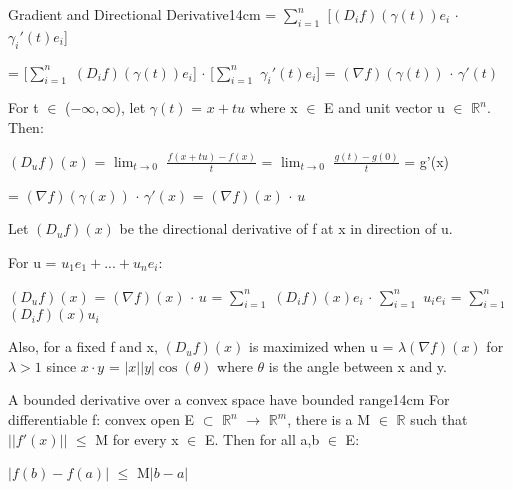 \begin{definition}{Gradient and Directional Derivative}{14cm}
        \hspace{2.15cm}
        = $\sum_{i=1}^n$ [$(D_if)(\gamma(t))e_i$ $\cdot$ $\gamma_i'(t)e_i$]

        \hspace{2.15cm}
        = [$\sum_{i=1}^n$ $(D_if)(\gamma(t))e_i$]
        $\cdot$ [$\sum_{i=1}^n$ $\gamma_i'(t)e_i$]
        = $(\nabla f)(\gamma(t))$ $\cdot$ $\gamma'(t)$

        For t $\in$ ($-\infty,\infty$), let $\gamma(t)$ = $x + tu$
        where x $\in$ E and unit vector u $\in$ $\mathbb{R}^n$. Then:

        \hspace{0.5cm}
        $(D_uf)(x)$
        = $\lim_{t \rightarrow 0}$ $\frac{f(x+tu) - f(x)}{t}$
        = $\lim_{t \rightarrow 0}$ $\frac{g(t) - g(0)}{t}$
        = g'(x)

        \hspace{2.3cm}
        = $(\nabla f)(\gamma(x))$ $\cdot$ $\gamma'(x)$
        = $(\nabla f)(x)$ $\cdot$ $u$

        Let $(D_uf)(x)$ be the {\color{lblue} directional derivative}
        of f at x in direction of u.

        For u = $u_1e_1 + ... + u_ne_i$:

        \hspace{0.5cm}
        $(D_uf)(x)$
        = $(\nabla f)(x)$ $\cdot$ $u$
        = $\sum_{i=1}^n$ $(D_if)(x)e_i$ $\cdot$ $\sum_{i=1}^n$ $u_ie_i$
        = $\sum_{i=1}^n$ $(D_if)(x)u_i$

        \vspace{0.3cm}

        Also, for a fixed f and x, $(D_uf)(x)$ is maximized when
        u = $\lambda (\nabla f)(x)$ for $\lambda > 1$
        since $x \cdot y$ = $|x| |y| \cos(\theta)$ where $\theta$ is the angle
        between x and y.
    \end{definition}

    \vspace{0.5cm}



    \begin{wtheorem}
    {A bounded derivative over a convex space have bounded range}{14cm}
        For differentiable f: convex open E $\subset$ $\mathbb{R}^n$
        $\rightarrow$ $\mathbb{R}^m$, there is a M $\in$ $\mathbb{R}$ such that
        $||f'(x)||$ $\leq$ M for every x $\in$ E. Then for all a,b $\in$ E:
        
        \hspace{0.5cm}
        $|f(b) - f(a)|$ $\leq$ M$|b-a|$
    \end{wtheorem}


